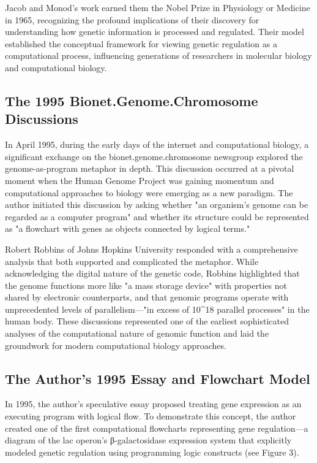 \documentclass[11pt]{article}
\begin{document}
Jacob and Monod's work earned them the Nobel Prize in Physiology or Medicine in 1965, recognizing the profound implications of their discovery for understanding how genetic information is processed and regulated. Their model established the conceptual framework for viewing genetic regulation as a computational process, influencing generations of researchers in molecular biology and computational biology.

\subsection{The 1995 Bionet.Genome.Chromosome Discussions}

In April 1995, during the early days of the internet and computational biology, a significant exchange on the bionet.genome.chromosome newsgroup explored the genome-as-program metaphor in depth. This discussion occurred at a pivotal moment when the Human Genome Project was gaining momentum and computational approaches to biology were emerging as a new paradigm. The author initiated this discussion by asking whether "an organism's genome can be regarded as a computer program" and whether its structure could be represented as "a flowchart with genes as objects connected by logical terms."

Robert Robbins of Johns Hopkins University responded with a comprehensive analysis that both supported and complicated the metaphor. While acknowledging the digital nature of the genetic code, Robbins highlighted that the genome functions more like "a mass storage device" with properties not shared by electronic counterparts, and that genomic programs operate with unprecedented levels of parallelism—"in excess of 10^18 parallel processes" in the human body. These discussions represented one of the earliest sophisticated analyses of the computational nature of genomic function and laid the groundwork for modern computational biology approaches.

\subsection{The Author's 1995 Essay and Flowchart Model}

In 1995, the author's speculative essay proposed treating gene expression as an executing program with logical flow. To demonstrate this concept, the author created one of the first computational flowcharts representing gene regulation—a diagram of the lac operon's β-galactosidase expression system that explicitly modeled genetic regulation using programming logic constructs (see Figure 3).
\end{document}
